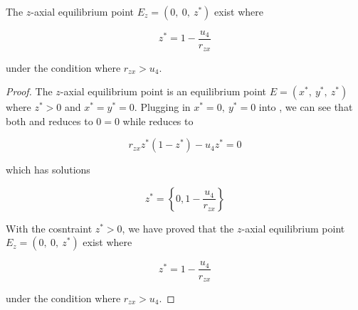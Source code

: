 \begin{theorem}\label{thm:eq-axial-z-exist}
    The $z$-axial equilibrium point $E_z=\left(0,\ 0,\ z^*\right)$ exist where
    
    \begin{equation*}
        z^* = 1-\frac{u_4}{r_{zx}}
    \end{equation*}

    under the condition where $r_{zx}>u_4$.
\end{theorem}
\begin{proof}
    The $z$-axial equilibrium point is an equilibrium point $E=\left(x^*,\ y^*,\ z^*\right)$ where $z^*>0$ and $x^*=y^*=0$. Plugging in $x^*=0,\ y^*=0$ into , we can see that both  and  reduces to $0=0$ while  reduces to

    \begin{equation*}
        r_{zx}z^*\left(1-z^*\right)-u_4z^*=0
    \end{equation*}

    which has solutions
    
    \begin{equation*}
        z^*=\left\{0,1-\frac{u_4}{r_{zx}}\right\}
    \end{equation*}
    
    With the cosntraint $z^*>0$, we have proved that the $z$-axial equilibrium point $E_z=\left(0,\ 0,\ z^*\right)$ exist where
    
    \begin{equation*}
        z^* = 1-\frac{u_4}{r_{zx}}
    \end{equation*}

    under the condition where $r_{zx}>u_4$.
\end{proof}

